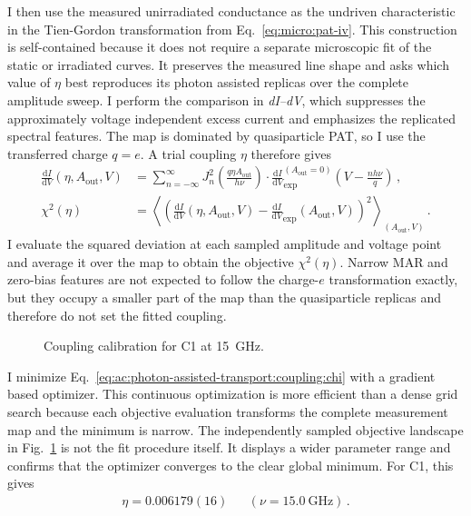         I then use the measured unirradiated conductance as the undriven characteristic in the Tien-Gordon transformation from Eq.~\eqref{eq:micro:pat-iv}. This construction is self-contained because it does not require a separate microscopic fit of the static or irradiated curves. It preserves the measured line shape and asks which value of $\eta$ best reproduces its photon assisted replicas over the complete amplitude sweep. I perform the comparison in \textit{dI--dV}, which suppresses the approximately voltage independent excess current and emphasizes the replicated spectral features. The map is dominated by quasiparticle PAT, so I use the transferred charge $q=e$. A trial coupling $\eta$ therefore gives
        \begin{align}
            \tfrac{\mathrm{d}I}{\mathrm{d}V}\left(\eta, A_\mathrm{out}, V\right)
            &= \sum_{n=-\infty}^{\infty}
                        J_n^2\!\left(\frac{q\eta A_\mathrm{out}}{h\nu}\right)\cdot
                        \tfrac{\mathrm{d}I}{\mathrm{d}V}_\mathrm{exp}^{(A_\mathrm{out}=0)}\!\left(V - \frac{n h\nu}{q}\right)\,,
            \label{eq:ac:photon-assisted-transport:coupling:dG}\\
            \chi^2(\eta) &= \left\langle\!\!\left(\tfrac{\mathrm{d}I}{\mathrm{d}V}(\eta, A_\mathrm{out}, V)-\tfrac{\mathrm{d}I}{\mathrm{d}V}_\mathrm{exp}(A_\mathrm{out}, V)\right)^2\right\rangle_{\!\!(A_\mathrm{out}, V)}\,.
            \label{eq:ac:photon-assisted-transport:coupling:chi}
        \end{align}
        I evaluate the squared deviation at each sampled amplitude and voltage point and average it over the map to obtain the objective $\chi^2(\eta)$. Narrow MAR and zero-bias features are not expected to follow the charge-$e$ transformation exactly, but they occupy a smaller part of the map than the quasiparticle replicas and therefore do not set the fitted coupling.

        \begin{figure}
            \captionsetup{format=plain}%
            \centering
            \caption{
                Coupling calibration for C1 at \qty{15}{\giga\hertz}.
            }
            \label{fig:ac:contact1:eta}
        \end{figure}
        I minimize Eq.~\eqref{eq:ac:photon-assisted-transport:coupling:chi} with a gradient based optimizer. This continuous optimization is more efficient than a dense grid search because each objective evaluation transforms the complete measurement map and the minimum is narrow. The independently sampled objective landscape in Fig.~\ref{fig:ac:contact1:eta} is not the fit procedure itself. It displays a wider parameter range and confirms that the optimizer converges to the clear global minimum. For C1, this gives
        \begin{align}
            \eta = 0.006179(16) && (\nu = \qty{15.0}{\giga\hertz})\,.
            \label{eq:ac:contact1:eta}
        \end{align}

